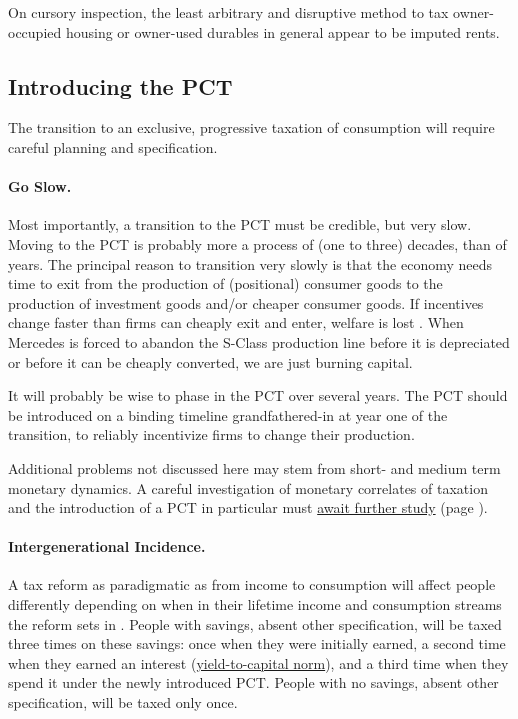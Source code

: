 On cursory inspection, the least arbitrary and disruptive method to tax owner-occupied housing or owner-used durables in general appear to be imputed rents.

\subsection{Introducing the PCT} The transition to an exclusive, progressive taxation of consumption will require careful planning and specification.

\paragraph{Go Slow.}  \label{sec:GoSlow} Most importantly, a transition to the PCT must be credible, but very slow.
Moving to the PCT is probably more a process of (one to three) decades, than of years.
The principal reason to transition very slowly is that the economy needs time to exit from the production of (positional) consumer goods to the production of investment goods and/or cheaper consumer goods.
If incentives change faster than firms can cheaply exit and enter, welfare is lost \citep[20]{Seidman1997}.
When Mercedes is forced to abandon the S-Class production line before it is depreciated or before it can be cheaply converted, we are just burning capital.

It will probably be wise to phase in the PCT over several years.
The PCT should be introduced on a binding timeline grandfathered-in at year one of the transition, to reliably incentivize firms to change their production.

Additional problems not discussed here may stem from short- and medium term monetary dynamics.
A careful investigation of monetary correlates of taxation and the introduction of a PCT in particular must \hyperref[sec:LooseEnds]{await further study} (page \pageref{sec:LooseEnds}).

\paragraph{Intergenerational Incidence.}  \label{sec:IntergenerationalIncidence} A tax reform as paradigmatic as from income to consumption will affect people differently depending on when in their lifetime income and consumption streams the reform sets in \citep[1649]{Graetz2009}.
People with savings, absent other specification, will be taxed three times on these savings:
once when they were initially earned, a second time when they earned an interest (\hyperref[sec:Y2C]{yield-to-capital norm}), and a third time when they spend it under the newly introduced PCT.
People with no savings, absent other specification, will be taxed only once.

